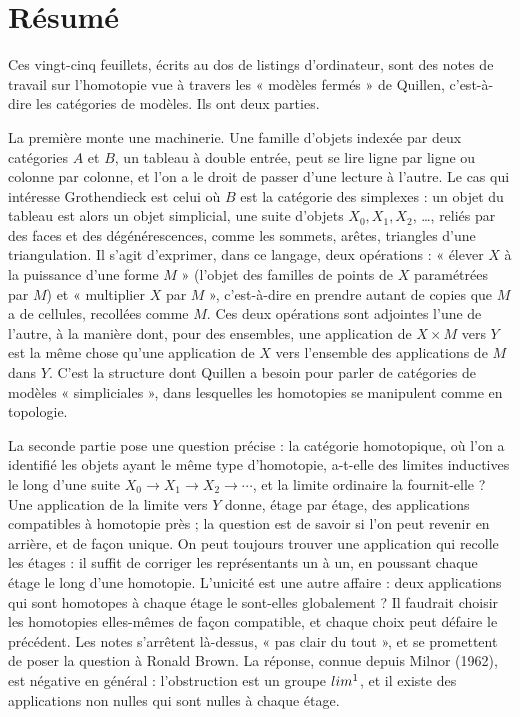 \documentclass[11pt,a4paper]{article}
\begin{document}
\section*{Résumé}

\begin{resume}
Ces vingt-cinq feuillets, écrits au dos de listings d'ordinateur, sont des
notes de travail sur l'homotopie vue à travers les « modèles fermés » de
Quillen, c'est-à-dire les catégories de modèles. Ils ont deux parties.

La première monte une machinerie. Une famille d'objets indexée par deux
catégories $A$ et $B$, un tableau à double entrée, peut se lire ligne par
ligne ou colonne par colonne, et l'on a le droit de passer d'une lecture à
l'autre. Le cas qui intéresse Grothendieck est celui où $B$ est la catégorie
des simplexes : un objet du tableau est alors un objet simplicial, une suite
d'objets $X_{0}, X_{1}, X_{2}$, …, reliés par des faces et des
dégénérescences, comme les sommets, arêtes, triangles d'une triangulation. Il
s'agit d'exprimer, dans ce langage, deux opérations : « élever $X$ à la
puissance d'une forme $M$ » (l'objet des familles de points de $X$
paramétrées par $M$) et « multiplier $X$ par $M$ », c'est-à-dire en prendre
autant de copies que $M$ a de cellules, recollées comme $M$. Ces deux
opérations sont adjointes l'une de l'autre, à la manière dont, pour des
ensembles, une application de $X \times M$ vers $Y$ est la même chose qu'une
application de $X$ vers l'ensemble des applications de $M$ dans $Y$. C'est
la structure dont Quillen a besoin pour parler de catégories de
modèles « simpliciales », dans lesquelles les homotopies se manipulent comme en
topologie.

La seconde partie pose une question précise : la catégorie homotopique, où
l'on a identifié les objets ayant le même type d'homotopie, a-t-elle des
limites inductives le long d'une suite $X_{0} \to X_{1} \to X_{2} \to \cdots$,
et la limite ordinaire la fournit-elle ? Une application de la limite vers
$Y$ donne, étage par étage, des applications compatibles à homotopie près ; la
question est de savoir si l'on peut revenir en arrière, et de façon unique. On
peut toujours trouver une application qui recolle les étages : il suffit de
corriger les représentants un à un, en poussant chaque étage le long d'une
homotopie. L'unicité est une autre affaire : deux applications qui sont
homotopes à chaque étage le sont-elles globalement ? Il faudrait choisir les
homotopies elles-mêmes de façon compatible, et chaque choix peut défaire le
précédent. Les notes s'arrêtent là-dessus, « pas clair du tout », et se
promettent de poser la question à Ronald Brown. La réponse, connue depuis
Milnor (1962), est négative en général : l'obstruction est un groupe
$\varprojlim^{1}$, et il existe des applications non nulles qui sont nulles à
chaque étage.


\end{resume}
\end{document}
